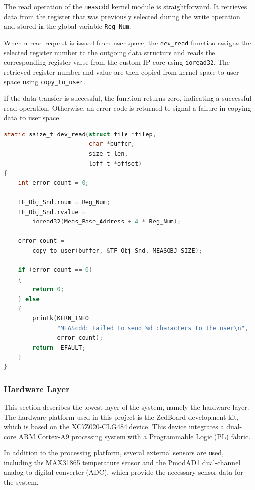 The read operation of the \texttt{meascdd} kernel module is straightforward. It 
retrieves data from the register that was previously selected during the write 
operation and stored in the global variable \texttt{Reg\_Num}.

When a read request is issued from user space, the \texttt{dev\_read} function 
assigns the selected register number to the outgoing data structure and reads 
the corresponding register value from the custom IP core using \texttt{ioread32}. 
The retrieved register number and value are then copied from kernel space to 
user space using \texttt{copy\_to\_user}.

If the data transfer is successful, the function returns zero, indicating a 
successful read operation. Otherwise, an error code is returned to signal a 
failure in copying data to user space.

\begin{lstlisting}[language=C,
caption={Read operation implementation of the meascdd kernel module},
label={lst:meascdd_read}]
static ssize_t dev_read(struct file *filep,
                        char *buffer,
                        size_t len,
                        loff_t *offset)
{
    int error_count = 0;

    TF_Obj_Snd.rnum = Reg_Num;
    TF_Obj_Snd.rvalue =
        ioread32(Meas_Base_Address + 4 * Reg_Num);

    error_count =
        copy_to_user(buffer, &TF_Obj_Snd, MEASOBJ_SIZE);

    if (error_count == 0) 
    {
        return 0;
    } else 
    {
        printk(KERN_INFO
               "MEAScdd: Failed to send %d characters to the user\n",
               error_count);
        return -EFAULT;
    }
}
\end{lstlisting}




\subsubsection{Hardware Layer}
This section describes the lowest layer of the system, namely the hardware layer. 
The hardware platform used in this project is the ZedBoard development kit, which is
based on the XC7Z020-CLG484 device. This device integrates a dual-core ARM Cortex-A9 
processing system with a Programmable Logic (PL) fabric.

In addition to the processing platform, several external sensors are used, including 
the MAX31865 temperature sensor and the PmodAD1 dual-channel analog-to-digital 
converter (ADC), which provide the necessary sensor data for the system.

